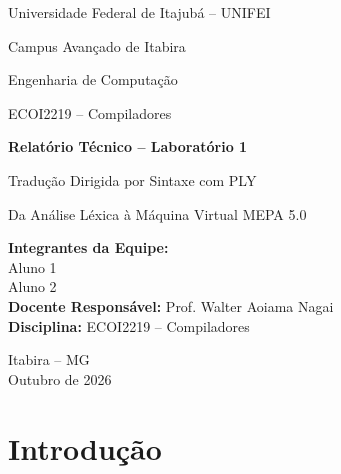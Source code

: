 \documentclass[12pt,a4paper]{article}
\begin{document}
\begin{titlepage}
    \centering

    {\Large Universidade Federal de Itajubá -- UNIFEI\par}
    \vspace{0.4cm}

    {\large Campus Avançado de Itabira\par}
    \vspace{0.4cm}

    {\large Engenharia de Computação\par}
    \vspace{1.2cm}

    {\Large ECOI2219 -- Compiladores\par}
    \vspace{1.5cm}

    {\Huge \textbf{Relatório Técnico -- Laboratório 1}\par}
    \vspace{0.5cm}

    {\LARGE Tradução Dirigida por Sintaxe com PLY\par}
    \vspace{0.4cm}
    {\large Da Análise Léxica à Máquina Virtual MEPA 5.0\par}

    \vfill

    \begin{flushleft}
        \textbf{Integrantes da Equipe:}\\
        Aluno 1\\
        Aluno 2\\[0.5cm]

        \textbf{Docente Responsável:} Prof. Walter Aoiama Nagai\\
        \textbf{Disciplina:} ECOI2219 -- Compiladores
    \end{flushleft}

    \vfill

    Itabira -- MG\\
    Outubro de 2026

\end{titlepage}

\tableofcontents
\newpage

\section{Introdução}
\end{document}
